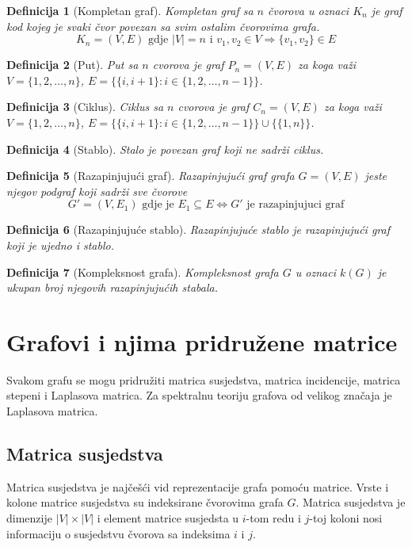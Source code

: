 \documentclass[11pt]{article}
\newtheorem{definition}{Definicija}
\begin{document}
		\begin{definition}[Kompletan graf]
		Kompletan graf sa $n$ čvorova u oznaci $K_n$ je graf kod kojeg je svaki čvor povezan sa svim ostalim čvorovima grafa. 
		\[ 
			K_n = (V,E) \text{ gdje } |V| = n \text{ i } v_1,v_2 \in V \Rightarrow \{v_1,v_2\} \in E
		\]
		\end{definition}
		
		\begin{definition}[Put]
		Put sa $n$ cvorova je graf $P_n=(V,E)$ za koga važi $V = \{1,2, \dots ,n\}$, $E = \{\{i, i+1\} : i \in \{1,2, \dots , n-1\} \}$.
		\end{definition}
		
		\begin{definition}[Ciklus]
		Ciklus sa $n$ cvorova je graf $C_n=(V,E)$ za koga važi $V = \{1,2, \dots ,n\}$, $E = \{\{i, i+1\} : i \in \{1,2, \dots , n-1\} \} \cup \{\{1,n\}\}$.
		\end{definition}
	
		\begin{definition}[Stablo]
		Stalo je povezan graf koji ne sadrži ciklus.
		\end{definition}
	
		\begin{definition}[Razapinjujući graf]
		Razapinjujući graf grafa $G = (V,E)$ jeste njegov podgraf koji sadrži sve čvorove
		\[
			G' = (V, E_1) \text{ gdje je } E_1 \subseteq E \Leftrightarrow G' \text{ je razapinjujuci graf} 
		\]
		\end{definition}
	
		\begin{definition}[Razapinjujuće stablo]
		Razapinjujuće stablo je razapinjujući graf koji je ujedno i stablo.
		\end{definition}
	
		\begin{definition}[Kompleksnost grafa]
		Kompleksnost grafa $G$ u oznaci $k(G)$ je ukupan broj njegovih razapinjujućih stabala. 
		\end{definition}
	
	\section{Grafovi i njima pridružene matrice}
	Svakom grafu se mogu pridružiti matrica susjedstva, matrica incidencije, matrica stepeni i Laplasova matrica.
	Za spektralnu teoriju grafova od velikog značaja je Laplasova matrica.
	
		\subsection{Matrica susjedstva}
		Matrica susjedstva je najčešći vid reprezentacije grafa pomoću matrice. 
		Vrste i kolone matrice susjedstva su indeksirane čvorovima grafa $G$.  
		Matrica susjedstva je dimenzije $|V| \times |V|$ i element matrice susjedsta u $i$-tom redu i $j$-toj koloni nosi informaciju o susjedstvu čvorova sa indeksima $i$ i $j$.
	
\end{document}
